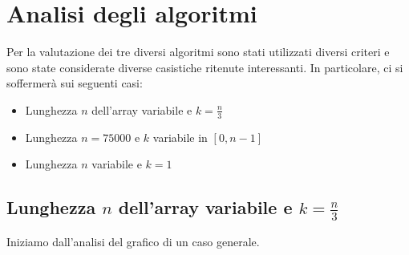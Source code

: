 \documentclass{article}
\begin{document}

	
	
	\newpage	
	\section{Analisi degli algoritmi}
	Per la valutazione dei tre diversi algoritmi sono stati utilizzati diversi criteri e sono state considerate diverse casistiche ritenute interessanti. In particolare, ci si soffermerà sui seguenti casi:
	
	\begin{itemize}
		\item Lunghezza $n$ dell'array variabile e $k=\frac{n}{3}$
		\item Lunghezza $n=75000$ e $k$ variabile in $[0,n-1]$
		\item Lunghezza $n$ variabile e $k=1$
	\end{itemize}
	
	\newpage
	
	\subsection{Lunghezza $n$ dell'array variabile e $k=\frac{n}{3}$}
	Iniziamo dall'analisi del grafico di un caso generale.
	
\end{document}
